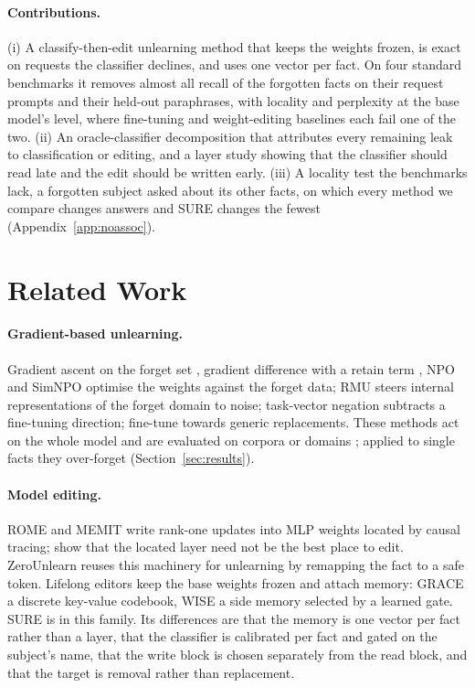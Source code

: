 \documentclass{article}
\theoremstyle{remark}
\theoremstyle{definition}
\begin{document}
\paragraph{Contributions.}
(i) A classify-then-edit unlearning method that keeps the weights frozen, is exact on requests the classifier declines, and uses one vector per fact. On four standard benchmarks it removes almost all recall of the forgotten facts on their request prompts and their held-out paraphrases, with locality and perplexity at the base model's level, where fine-tuning and weight-editing baselines each fail one of the two. (ii) An oracle-classifier decomposition that attributes every remaining leak to classification or editing, and a layer study showing that the classifier should read late and the edit should be written early. (iii) A locality test the benchmarks lack, a forgotten subject asked about its other facts, on which every method we compare changes answers and SURE changes the fewest (Appendix~\ref{app:noassoc}).

\section{Related Work}
\label{sec:related}

\paragraph{Gradient-based unlearning.}
Gradient ascent on the forget set \citep{jang2023knowledgeunlearning}, gradient difference with a retain term \citep{liu2022gd}, NPO \citep{zhang2024npo} and SimNPO \citep{fan2024simnpo} optimise the weights against the forget data; RMU \citep{li2024wmdp} steers internal representations of the forget domain to noise; task-vector negation \citep{ilharco2023taskvectors} subtracts a fine-tuning direction; \citet{eldan2023whp} fine-tune towards generic replacements. These methods act on the whole model and are evaluated on corpora or domains \citep{maini2024tofu,shi2025muse,li2024wmdp}; applied to single facts they over-forget (Section~\ref{sec:results}).

\paragraph{Model editing.}
ROME \citep{meng2022rome} and MEMIT \citep{meng2023memit} write rank-one updates into MLP weights located by causal tracing; \citet{hase2023localization} show that the located layer need not be the best place to edit. ZeroUnlearn \citep{lin2026zerounlearn} reuses this machinery for unlearning by remapping the fact to a safe token. Lifelong editors keep the base weights frozen and attach memory: GRACE \citep{hartvigsen2023grace} a discrete key-value codebook, WISE \citep{wang2024wise} a side memory selected by a learned gate. SURE is in this family. Its differences are that the memory is one vector per fact rather than a layer, that the classifier is calibrated per fact and gated on the subject's name, that the write block is chosen separately from the read block, and that the target is removal rather than replacement.
\end{document}
